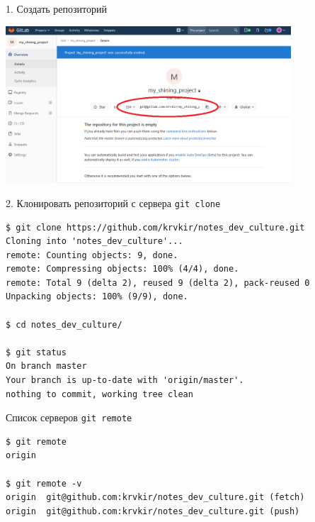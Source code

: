 \documentclass[presentation]{beamer}
\begin{document}
\begin{frame}[label={sec:orgfa4e295}]{1. Создать репозиторий}
\begin{center}
\includegraphics[width=0.8\textwidth]{./01_vcs_03_remote_create_repo_3.PNG}
\end{center}
\end{frame}

\begin{frame}[fragile,label={sec:orgaad8efb}]{2. Клонировать репозиторий с сервера}
 \alert{\texttt{git clone}}

\begin{verbatim}
$ git clone https://github.com/krvkir/notes_dev_culture.git                               
Cloning into 'notes_dev_culture'...
remote: Counting objects: 9, done.
remote: Compressing objects: 100% (4/4), done.
remote: Total 9 (delta 2), reused 9 (delta 2), pack-reused 0
Unpacking objects: 100% (9/9), done.

$ cd notes_dev_culture/

$ git status
On branch master
Your branch is up-to-date with 'origin/master'.
nothing to commit, working tree clean
\end{verbatim}
\end{frame}

\begin{frame}[fragile,label={sec:org779d230}]{ Список серверов}
 \alert{\texttt{git remote}}

\begin{verbatim}
$ git remote
origin

$ git remote -v
origin  git@github.com:krvkir/notes_dev_culture.git (fetch)
origin  git@github.com:krvkir/notes_dev_culture.git (push)
\end{verbatim}
\end{frame}
\end{document}
